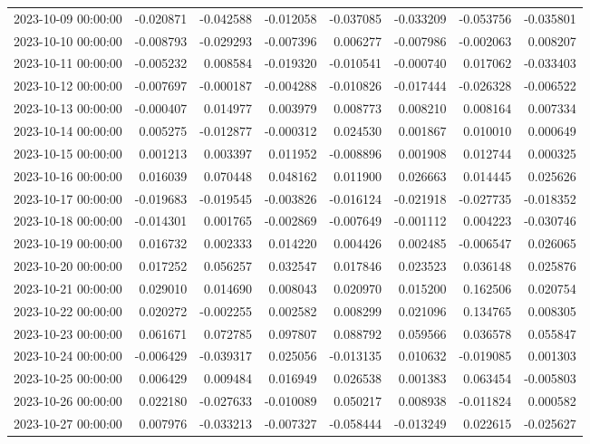 \begin{tabular}{lrrrrrrr}
2023-10-09 00:00:00 & -0.020871 & -0.042588 & -0.012058 & -0.037085 & -0.033209 & -0.053756 & -0.035801 \\
2023-10-10 00:00:00 & -0.008793 & -0.029293 & -0.007396 & 0.006277 & -0.007986 & -0.002063 & 0.008207 \\
2023-10-11 00:00:00 & -0.005232 & 0.008584 & -0.019320 & -0.010541 & -0.000740 & 0.017062 & -0.033403 \\
2023-10-12 00:00:00 & -0.007697 & -0.000187 & -0.004288 & -0.010826 & -0.017444 & -0.026328 & -0.006522 \\
2023-10-13 00:00:00 & -0.000407 & 0.014977 & 0.003979 & 0.008773 & 0.008210 & 0.008164 & 0.007334 \\
2023-10-14 00:00:00 & 0.005275 & -0.012877 & -0.000312 & 0.024530 & 0.001867 & 0.010010 & 0.000649 \\
2023-10-15 00:00:00 & 0.001213 & 0.003397 & 0.011952 & -0.008896 & 0.001908 & 0.012744 & 0.000325 \\
2023-10-16 00:00:00 & 0.016039 & 0.070448 & 0.048162 & 0.011900 & 0.026663 & 0.014445 & 0.025626 \\
2023-10-17 00:00:00 & -0.019683 & -0.019545 & -0.003826 & -0.016124 & -0.021918 & -0.027735 & -0.018352 \\
2023-10-18 00:00:00 & -0.014301 & 0.001765 & -0.002869 & -0.007649 & -0.001112 & 0.004223 & -0.030746 \\
2023-10-19 00:00:00 & 0.016732 & 0.002333 & 0.014220 & 0.004426 & 0.002485 & -0.006547 & 0.026065 \\
2023-10-20 00:00:00 & 0.017252 & 0.056257 & 0.032547 & 0.017846 & 0.023523 & 0.036148 & 0.025876 \\
2023-10-21 00:00:00 & 0.029010 & 0.014690 & 0.008043 & 0.020970 & 0.015200 & 0.162506 & 0.020754 \\
2023-10-22 00:00:00 & 0.020272 & -0.002255 & 0.002582 & 0.008299 & 0.021096 & 0.134765 & 0.008305 \\
2023-10-23 00:00:00 & 0.061671 & 0.072785 & 0.097807 & 0.088792 & 0.059566 & 0.036578 & 0.055847 \\
2023-10-24 00:00:00 & -0.006429 & -0.039317 & 0.025056 & -0.013135 & 0.010632 & -0.019085 & 0.001303 \\
2023-10-25 00:00:00 & 0.006429 & 0.009484 & 0.016949 & 0.026538 & 0.001383 & 0.063454 & -0.005803 \\
2023-10-26 00:00:00 & 0.022180 & -0.027633 & -0.010089 & 0.050217 & 0.008938 & -0.011824 & 0.000582 \\
2023-10-27 00:00:00 & 0.007976 & -0.033213 & -0.007327 & -0.058444 & -0.013249 & 0.022615 & -0.025627 \\

\end{tabular}
